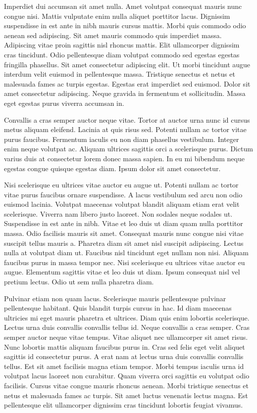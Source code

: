 \documentclass[11pt,a4paper]{article}
\begin{document}
Imperdiet dui accumsan sit amet nulla. Amet volutpat consequat mauris nunc congue nisi. Mattis vulputate enim nulla aliquet porttitor lacus. Dignissim suspendisse in est ante in nibh mauris cursus mattis. Morbi quis commodo odio aenean sed adipiscing. Sit amet mauris commodo quis imperdiet massa. Adipiscing vitae proin sagittis nisl rhoncus mattis. Elit ullamcorper dignissim cras tincidunt. Odio pellentesque diam volutpat commodo sed egestas egestas fringilla phasellus. Sit amet consectetur adipiscing elit. Ut morbi tincidunt augue interdum velit euismod in pellentesque massa. Tristique senectus et netus et malesuada fames ac turpis egestas. Egestas erat imperdiet sed euismod. Dolor sit amet consectetur adipiscing. Neque gravida in fermentum et sollicitudin. Massa eget egestas purus viverra accumsan in.

Convallis a cras semper auctor neque vitae. Tortor at auctor urna nunc id cursus metus aliquam eleifend. Lacinia at quis risus sed. Potenti nullam ac tortor vitae purus faucibus. Fermentum iaculis eu non diam phasellus vestibulum. Integer enim neque volutpat ac. Aliquam ultrices sagittis orci a scelerisque purus. Dictum varius duis at consectetur lorem donec massa sapien. In eu mi bibendum neque egestas congue quisque egestas diam. Ipsum dolor sit amet consectetur.

Nisi scelerisque eu ultrices vitae auctor eu augue ut. Potenti nullam ac tortor vitae purus faucibus ornare suspendisse. A lacus vestibulum sed arcu non odio euismod lacinia. Volutpat maecenas volutpat blandit aliquam etiam erat velit scelerisque. Viverra nam libero justo laoreet. Non sodales neque sodales ut. Suspendisse in est ante in nibh. Vitae et leo duis ut diam quam nulla porttitor massa. Odio facilisis mauris sit amet. Consequat mauris nunc congue nisi vitae suscipit tellus mauris a. Pharetra diam sit amet nisl suscipit adipiscing. Lectus nulla at volutpat diam ut. Faucibus nisl tincidunt eget nullam non nisi. Aliquam faucibus purus in massa tempor nec. Nisi scelerisque eu ultrices vitae auctor eu augue. Elementum sagittis vitae et leo duis ut diam. Ipsum consequat nisl vel pretium lectus. Odio ut sem nulla pharetra diam.

Pulvinar etiam non quam lacus. Scelerisque mauris pellentesque pulvinar pellentesque habitant. Quis blandit turpis cursus in hac. Id diam maecenas ultricies mi eget mauris pharetra et ultrices. Diam quis enim lobortis scelerisque. Lectus urna duis convallis convallis tellus id. Neque convallis a cras semper. Cras semper auctor neque vitae tempus. Vitae aliquet nec ullamcorper sit amet risus. Nunc lobortis mattis aliquam faucibus purus in. Cras sed felis eget velit aliquet sagittis id consectetur purus. A erat nam at lectus urna duis convallis convallis tellus. Est sit amet facilisis magna etiam tempor. Morbi tempus iaculis urna id volutpat lacus laoreet non curabitur. Quam viverra orci sagittis eu volutpat odio facilisis. Cursus vitae congue mauris rhoncus aenean. Morbi tristique senectus et netus et malesuada fames ac turpis. Sit amet luctus venenatis lectus magna. Est pellentesque elit ullamcorper dignissim cras tincidunt lobortis feugiat vivamus.
\end{document}
